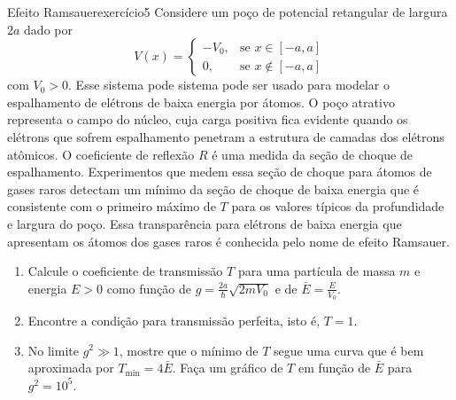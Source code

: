 \begin{exercício}{Efeito Ramsauer}{exercício5}
    Considere um poço de potencial retangular de largura \(2a\) dado por
    \begin{equation*}
        V(x) = \begin{cases}
            -V_0,&\text{se }x \in [-a,a]\\
            0,&\text{se }x \notin[-a,a]
        \end{cases}
    \end{equation*}
    com \(V_0 > 0\). Esse sistema pode sistema pode ser usado para modelar o espalhamento de elétrons de baixa energia por átomos. O poço atrativo representa o campo do núcleo, cuja carga positiva fica evidente quando os elétrons que sofrem espalhamento penetram a estrutura de camadas dos elétrons atômicos. O coeficiente de reflexão \(R\) é uma medida da seção de choque de espalhamento. Experimentos que medem essa seção de choque para átomos de gases raros detectam um mínimo da seção de choque de baixa energia que é consistente com o primeiro máximo de \(T\) para os valores típicos da profundidade e largura do poço. Essa transparência para elétrons de baixa energia que apresentam os átomos dos gases raros é conhecida pelo nome de efeito Ramsauer.
    \begin{enumerate}[label=(\alph*)]
        \item Calcule o coeficiente de transmissão \(T\) para uma partícula de massa \(m\) e energia \(E > 0\) como função de \(g = \frac{2a}{\hbar}\sqrt{2mV_0}\) e de \(\bar{E} = \frac{E}{V_0}.\)
        \item Encontre a condição para transmissão perfeita, isto é, \(T = 1\).
        \item No limite \(g^2 \gg 1\), mostre que o mínimo de \(T\) segue uma curva que é bem aproximada por \(T_\mathrm{min} = 4\bar{E}\). Faça um gráfico de \(T\) em função de \(\bar{E}\) para \(g^2 = 10^5\).
    \end{enumerate}
\end{exercício}
